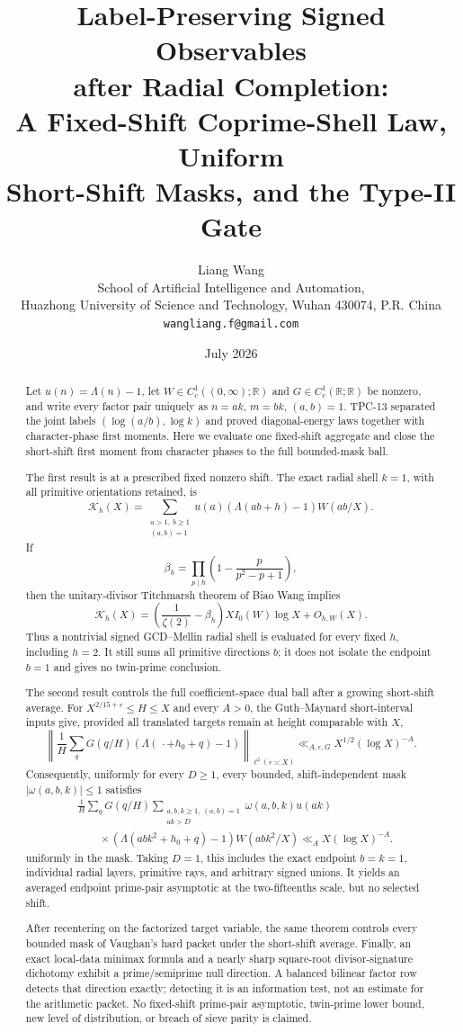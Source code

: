 \documentclass[11pt]{article}
\title{\textbf{Label-Preserving Signed Observables}\\
\textbf{after Radial Completion:}\\
\textbf{A Fixed-Shift Coprime-Shell Law, Uniform}\\
\textbf{Short-Shift Masks, and the Type-II Gate}}
\author{Liang Wang\\
\small School of Artificial Intelligence and Automation,\\[-0.2em]
\small Huazhong University of Science and Technology, Wuhan 430074, P.R. China\\
\small \texttt{wangliang.f@gmail.com}}
\date{July 2026}
\theoremstyle{definition}
\theoremstyle{remark}
\newcommand{\R}{\mathbb R}
\newcommand{\eps}{\varepsilon}
\newcommand{\cK}{\mathcal K}
\begin{document}
\maketitle

\begin{abstract}
Let $u(n)=\Lambda(n)-1$, let
$W\in C_c^1((0,\infty);\R)$ and $G\in C_c^1(\R;\R)$ be nonzero, and
write every factor pair uniquely as
$n=ak$, $m=bk$, $(a,b)=1$.  TPC-13 separated the joint labels
$(\log(a/b),\log k)$ and proved diagonal-energy laws together with
character-phase first moments.  Here we evaluate one fixed-shift aggregate
and close the short-shift first moment from character phases to the full
bounded-mask ball.

The first result is at a prescribed fixed nonzero shift.  The exact radial
shell $k=1$, with all primitive orientations retained, is
\[
 \cK_h(X)=
 \sum_{\substack{a>1,\ b\geq1\\(a,b)=1}}
 u(a)(\Lambda(ab+h)-1)W(ab/X).
\]
If
\[
 \beta_h=\prod_{p\mid h}
 \left(1-\frac{p}{p^2-p+1}\right),
\]
then the unitary-divisor Titchmarsh theorem of Biao Wang implies
\[
 \cK_h(X)=
 \left(\frac1{\zeta(2)}-\beta_h\right)
 XI_0(W)\log X+O_{h,W}(X).
\]
Thus a nontrivial signed GCD--Mellin radial shell is evaluated for every
fixed $h$, including $h=2$.  It still sums all primitive directions $b$;
it does not isolate the endpoint $b=1$ and gives no twin-prime conclusion.

The second result controls the full coefficient-space dual ball after a
growing short-shift average.  For
$X^{2/15+\eps}\leq H\leq X$ and every $A>0$, the Guth--Maynard
short-interval inputs give, provided all translated targets remain at
height comparable with $X$,
\[
 \left\|
 \frac1H\sum_qG(q/H)(\Lambda(\,\cdot+h_0+q)-1)
 \right\|_{\ell^2(r\asymp X)}
 \ll_{A,\eps,G}X^{1/2}(\log X)^{-A}.
\]
Consequently, uniformly for every $D\geq1$, every bounded,
shift-independent mask $|\omega(a,b,k)|\leq1$ satisfies
\[
 \begin{aligned}
 &\frac1H\sum_qG(q/H)
 \sum_{\substack{a,b,k\geq1,\ (a,b)=1\\ak>D}}
 \omega(a,b,k)u(ak)\\
 &\qquad{}\times
 (\Lambda(abk^2+h_0+q)-1)W(abk^2/X)
 \ll_A X(\log X)^{-A}.
 \end{aligned}
\]
uniformly in the mask.  Taking $D=1$, this includes the exact endpoint
$b=k=1$,
individual radial layers, primitive rays, and arbitrary signed unions.
It yields an averaged endpoint prime-pair asymptotic at the
two-fifteenths scale, but no selected shift.

After recentering on the factorized target variable, the same theorem
controls every bounded mask of Vaughan's hard packet under the short-shift
average.  Finally, an exact local-data minimax formula and a nearly sharp
square-root divisor-signature dichotomy exhibit a prime/semiprime null
direction.  A balanced bilinear factor row detects that direction exactly;
detecting it is an information test, not an estimate for the arithmetic
packet.  No fixed-shift prime-pair asymptotic, twin-prime lower bound, new
level of distribution, or breach of sieve parity is claimed.
\end{abstract}
\end{document}

